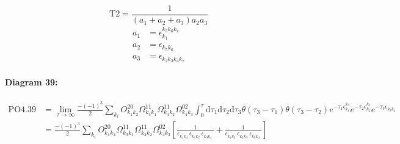\documentclass[10pt,a4paper]{article}
\begin{document}
\begin{equation}
\text{T}2 = \frac{1}{(a_1+ a_2+ a_3)a_2a_3}\end{equation}
\begin{align*}
a_1 &= \epsilon^{k_{5}k_{6}k_{7}}_{k_{1}}\\
a_2 &= \epsilon^{}_{k_{5}k_{6}}\\
a_3 &= \epsilon^{}_{k_{2}k_{3}k_{4}k_{7}}
\end{align*}
\paragraph{Diagram 39:}
\begin{align}
\text{PO}4.39
&= \lim\limits_{\tau \to \infty}\frac{-(-1)^3 }{2}\sum_{k_i}O^{20}_{k_{1}k_{2}} \Omega^{11}_{k_{3}k_{1}} \Omega^{11}_{k_{4}k_{2}} \Omega^{02}_{k_{4}k_{3}} \int_{0}^{\tau}\mathrm{d}\tau_1\mathrm{d}\tau_2\mathrm{d}\tau_3\theta(\tau_3-\tau_1) \theta(\tau_3-\tau_2) e^{-\tau_1 \epsilon^{k_{3}}_{k_{1}}}e^{-\tau_2 \epsilon^{k_{4}}_{k_{2}}}e^{-\tau_3 \epsilon^{}_{k_{3}k_{4}}}
 \nonumber \\
&= \frac{-(-1)^3 }{2}\sum_{k_i}O^{20}_{k_{1}k_{2}} \Omega^{11}_{k_{3}k_{1}} \Omega^{11}_{k_{4}k_{2}} \Omega^{02}_{k_{4}k_{3}} \left[\frac{1}{\epsilon^{}_{k_{1}k_{4}}\ \epsilon^{}_{k_{1}k_{2}}\ \epsilon^{}_{k_{3}k_{4}}\ } + \frac{1}{\epsilon^{}_{k_{1}k_{2}}\ \epsilon^{}_{k_{2}k_{3}}\ \epsilon^{}_{k_{3}k_{4}}\ } \right]
\end{align}
\end{document}
